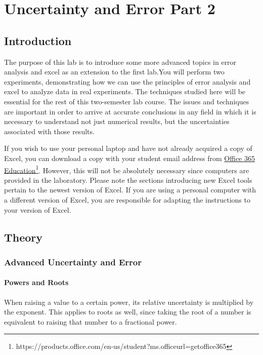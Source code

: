 \chapter{Uncertainty and Error Part 2}
\label{chap:excel2}
\section{Introduction}

The purpose of this lab is to introduce some more advanced topics in error analysis and excel as an extension to the first lab.You will perform two experiments, demonstrating how we can use the principles of error analysis and excel to analyze data in real experiments. The techniques studied here will be essential for the rest of this two-semester lab course. The issues and techniques are important in order to arrive at accurate conclusions in any field in which it is necessary to understand not just numerical results, but the uncertainties associated with those results. \myskip

If you wish to use your personal laptop and have not already acquired a copy of Excel, you can download a copy with your student email address from 
\href{https://products.office.com/en-us/student?ms.officeurl=getoffice365}{Office 365 Education}\footnote{https://products.office.com/en-us/student?ms.officeurl=getoffice365}. However, this will not be absolutely necessary since computers are provided in the laboratory. Please note the sections introducing new Excel tools pertain to the newest version of Excel. If you are using a personal computer with a different version of Excel, you are responsible for adapting the instructions to your version of Excel.


\section{Theory}
\subsection{Advanced Uncertainty and Error}
\subsubsection{Powers and Roots}

When raising a value to a certain power, its relative uncertainty is multiplied by the exponent. This applies to roots as well, since taking the root of a number is equivalent to raising that number to a fractional power.\myskip 

